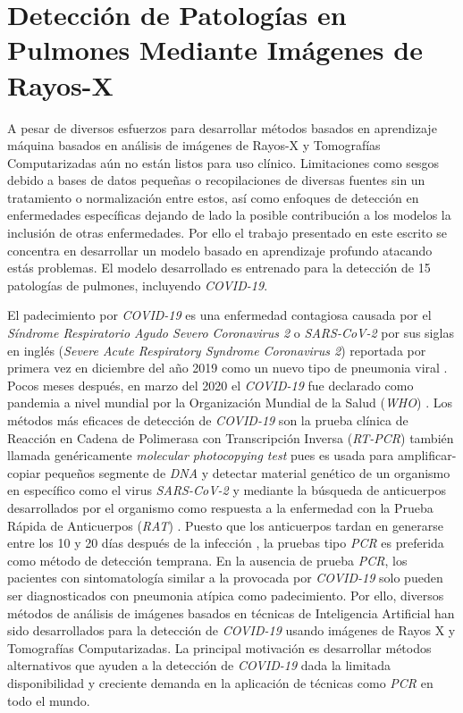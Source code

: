 \section{Detección de Patologías en Pulmones Mediante Imágenes de Rayos-X}

A pesar de diversos esfuerzos para desarrollar métodos basados en aprendizaje máquina basados en
análisis de imágenes de Rayos-X y Tomografías Computarizadas aún no están listos para uso clínico.
Limitaciones como sesgos debido a bases de datos pequeñas o recopilaciones de diversas fuentes sin
un tratamiento o normalización entre estos, así como enfoques de detección en enfermedades
específicas dejando de lado la posible contribución a los modelos la inclusión de otras enfermedades.
Por ello el trabajo presentado en este escrito se concentra en desarrollar un modelo basado en
aprendizaje profundo atacando estás problemas. El modelo desarrollado es entrenado para la detección
de 15 patologías de pulmones, incluyendo \textit{COVID-19}.

El padecimiento por \textit{COVID-19} es una enfermedad contagiosa causada por el \textit{Síndrome
Respiratorio Agudo Severo Coronavirus 2} o \textit{SARS-CoV-2} por sus siglas en inglés
(\textit{Severe Acute Respiratory Syndrome Coronavirus 2}) reportada por primera vez en diciembre
del año 2019 como un nuevo tipo de pneumonia viral \cite{huang2020clinical}. Pocos meses después,
en marzo del 2020 el \textit{COVID-19} fue declarado como pandemia a nivel mundial por la
Organización Mundial de la Salud (\textit{WHO}) \cite{world2020director}. Los métodos más eficaces
de detección de \textit{COVID-19} son la prueba clínica de Reacción en Cadena de Polimerasa con
Transcripción Inversa
(\textit{RT-PCR}) también llamada genéricamente \textit{molecular photocopying test} pues es usada
para amplificar-copiar pequeños
segmente de \textit{DNA} y detectar material genético de un organismo en específico como el virus
\textit{SARS-CoV-2} y mediante la búsqueda de anticuerpos desarrollados por el organismo como
respuesta a la enfermedad con la Prueba Rápida de Anticuerpos (\textit{RAT})
\cite{Gupta2021, Apra2021, pub.1136450856, LIU2021112817}. Puesto que los
anticuerpos tardan en generarse entre los 10 y 20 días después de la infección
\cite{lou2020serology,o2021age,VABRET2020910}, la pruebas tipo \textit{PCR} es preferida como
método de detección temprana. En la ausencia de prueba \textit{PCR}, los pacientes con sintomatología
similar a la provocada por \textit{COVID-19} solo pueden ser diagnosticados con pneumonia atípica
como padecimiento. Por ello, diversos métodos de análisis de imágenes basados en técnicas
de Inteligencia Artificial han sido desarrollados para la detección de \textit{COVID-19} usando
imágenes de Rayos X y Tomografías Computarizadas. La principal motivación es desarrollar métodos
alternativos que ayuden a la detección de \textit{COVID-19} dada la limitada disponibilidad y
creciente demanda en la aplicación de técnicas como \textit{PCR} en todo el mundo.
